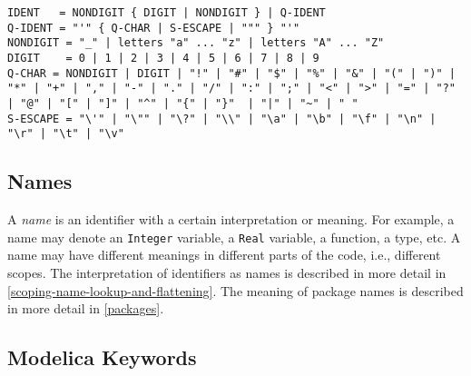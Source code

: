 \begin{lstlisting}[language=grammar,mathescape=false]
IDENT   = NONDIGIT { DIGIT | NONDIGIT } | Q-IDENT
Q-IDENT = "'" { Q-CHAR | S-ESCAPE | """ } "'"
NONDIGIT = "_" | letters "a" ... "z" | letters "A" ... "Z"
DIGIT    = 0 | 1 | 2 | 3 | 4 | 5 | 6 | 7 | 8 | 9
Q-CHAR = NONDIGIT | DIGIT | "!" | "#" | "$" | "%" | "&" | "(" | ")" | "*" | "+" | "," | "-" | "." | "/" | ":" | ";" | "<" | ">" | "=" | "?" | "@" | "[" | "]" | "^" | "{" | "}"  | "|" | "~" | " "
S-ESCAPE = "\'" | "\"" | "\?" | "\\" | "\a" | "\b" | "\f" | "\n" | "\r" | "\t" | "\v"
\end{lstlisting}

\subsection{Names}

A \emph{name} is an identifier with a certain interpretation or meaning.
For example, a name may denote an \lstinline!Integer! variable, a \lstinline!Real! variable, a
function, a type, etc. A name may have different meanings in different
parts of the code, i.e., different scopes. The interpretation of
identifiers as names is described in more detail in \autoref{scoping-name-lookup-and-flattening}. The
meaning of package names is described in more detail in \autoref{packages}.

\subsection{Modelica Keywords}

